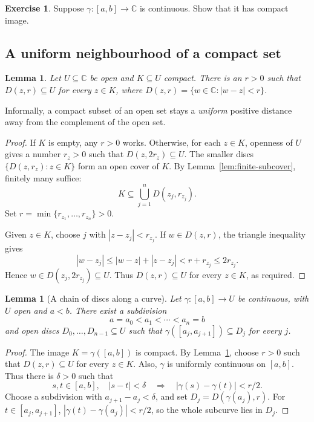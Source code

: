 \documentclass[11pt]{article}
\theoremstyle{plain}
\newtheorem{lemma}[theorem]{Lemma}
\theoremstyle{definition}
\newtheorem{exercise}[theorem]{Exercise}
\theoremstyle{remark}
\numberwithin{equation}{section}
\newcommand{\C}{\mathbb{C}}
\begin{document}
\begin{exercise}
Suppose $\gamma\colon[a,b]\to\C$ is continuous. Show that it has compact image.
\end{exercise}

\subsection{A uniform neighbourhood of a compact set}
\begin{lemma}\label{lem:compact-neighbourhood}
Let $U\subseteq\C$ be open and $K\subseteq U$ compact. There is an $r>0$
such that $D(z,r)\subseteq U$ for every $z\in K$, where
$D(z,r)=\{w\in\C:|w-z|<r\}$.
\end{lemma}

Informally, a compact subset of an open set stays a \textit{uniform} positive
distance away from the complement of the open set.


\begin{proof}
If $K$ is empty, any $r>0$ works. Otherwise, for each $z\in K$,
openness of $U$ gives a number $r_z>0$ such that
$D(z,2r_z)\subseteq U$. The smaller discs
$\{D(z,r_z):z\in K\}$ form an open cover of $K$. By
Lemma~\ref{lem:finite-subcover}, finitely many suffice:
\[
 K\subseteq\bigcup_{j=1}^n D(z_j,r_{z_j}).
\]
Set $r=\min\{r_{z_1},\ldots,r_{z_n}\}>0$.

Given $z\in K$, choose $j$ with $|z-z_j|<r_{z_j}$. If $w\in D(z,r)$,
the triangle inequality gives
\[
 |w-z_j|\leq |w-z|+|z-z_j|
 <r+r_{z_j}\leq2r_{z_j}.
\]
Hence $w\in D(z_j,2r_{z_j})\subseteq U$. Thus $D(z,r)\subseteq U$
for every $z\in K$, as required.
\end{proof}

\begin{lemma}[A chain of discs along a curve]\label{lem:disc-chain}
Let $\gamma\colon[a,b]\to U$ be continuous, with $U$ open and $a<b$.
There exist a subdivision
\[
 a=a_0<a_1<\cdots<a_n=b
\]
and open discs $D_0,\ldots,D_{n-1}\subseteq U$ such that
$\gamma([a_j,a_{j+1}])\subseteq D_j$ for every $j$.
\end{lemma}
\begin{proof}
The image $K=\gamma([a,b])$ is compact. By
Lemma~\ref{lem:compact-neighbourhood}, choose $r>0$ such that
$D(z,r)\subseteq U$ for every $z\in K$.
Also, $\gamma$ is uniformly continuous on $[a,b]$. Thus there is
$\delta>0$ such that
\[
 s,t\in[a,b],\quad |s-t|<\delta\quad\Longrightarrow\quad
 |\gamma(s)-\gamma(t)|<r/2.
\]
Choose a subdivision with $a_{j+1}-a_j<\delta$, and set
$D_j=D(\gamma(a_j),r)$. For $t\in[a_j,a_{j+1}]$,
$|\gamma(t)-\gamma(a_j)|<r/2$, so the whole subcurve lies in $D_j$.
\end{proof}
\end{document}
